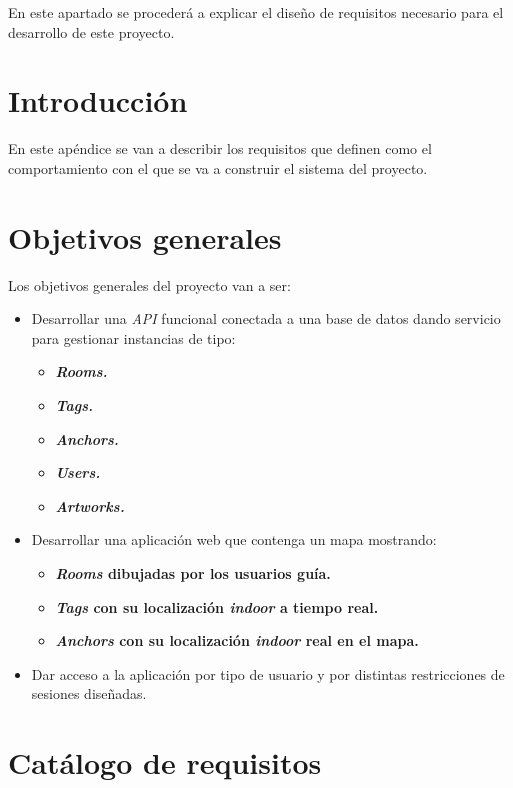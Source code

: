 En este apartado se procederá a explicar el diseño de requisitos necesario para el desarrollo de este proyecto.

\section{Introducción}
En este apéndice se van a describir los requisitos que definen como el comportamiento con el que se va a construir el sistema del proyecto.
\section{Objetivos generales}
Los objetivos generales del proyecto van a ser:
\begin{itemize}
    \item Desarrollar una \textit{API} funcional conectada a una base de datos dando servicio para gestionar instancias de tipo: 
        \begin{itemize}
            \item \textit{\textbf{Rooms.}}
            \item \textit{\textbf{Tags.}}
            \item \textit{\textbf{Anchors.}}
            \item \textit{\textbf{Users.}}
            \item \textit{\textbf{Artworks.}}
            
        \end{itemize}   
    \item Desarrollar una aplicación web que contenga un mapa mostrando:
        \begin{itemize}
            \item \textbf{\textit{Rooms} dibujadas por los usuarios guía.}
            \item \textbf{\textit{Tags} con su localización \textit{indoor} a tiempo real.}
            \item \textbf{\textit{Anchors} con su localización \textit{indoor} real en el mapa.}
        \end{itemize} 
    \item Dar acceso a la aplicación por tipo de usuario y por distintas restricciones de sesiones diseñadas.
\end{itemize}
\section{Catálogo de requisitos}
